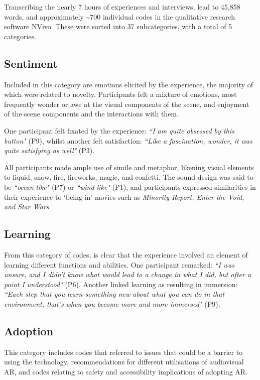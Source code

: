 Transcribing the nearly 7 hours of experiences and interviews, lead to 45,858 words, and approximately \textasciitilde{}700 individual codes in the qualitative research software NVivo. These were sorted into 37 subcategories, with a total of 5 categories.

\subsection{Sentiment}\label{sec: polaris-feedback-sentiment}
Included in this category are emotions elicited by the experience, the majority of which were related to novelty. Participants felt a mixture of emotions, most frequently wonder or awe at the visual components of the scene, and enjoyment of the scene components and the interactions with them.

One participant felt fixated by the experience: \textit{``I am quite obsessed by this button"} (P9), whilst another felt satisfaction: \textit{``Like a fascination, wonder, it was quite satisfying as well"} (P3).

All participants made ample use of simile and metaphor, likening visual elements to liquid, snow, fire, fireworks, magic, and confetti. The sound design was said to be \textit{``ocean-like"} (P7) or \textit{``wind-like"} (P1), and participants expressed similarities in their experience to ‘being in’ movies such as \textit{Minority Report, Enter the Void, and Star Wars}.

\subsection{Learning}\label{sec: polaris-feedback-learning}
From this category of codes, is clear that the experience involved an element of learning different functions and abilities. One participant remarked: \textit{``I was unsure, and I didn’t know what would lead to a change in what I did, but after a point I understood"} (P6). Another linked learning as resulting in immersion: \textit{``Each step that you learn something new about what you can do in that environment, that’s when you become more and more immersed"} (P9).

\subsection{Adoption}\label{sec: polaris-feedback-adoption}
This category includes codes that referred to issues that could be a barrier to using the technology, recommendations for different utilisations of audiovisual AR, and codes relating to safety and accessibility implications of adopting AR.

